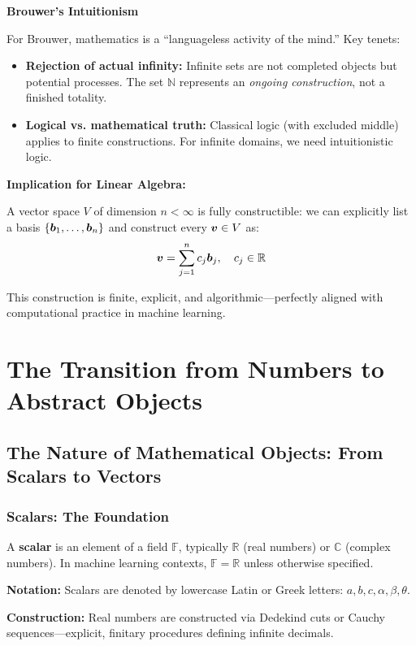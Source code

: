 \begin{intuitionbox}
    \textbf{Brouwer's Intuitionism}

    For Brouwer, mathematics is a ``languageless activity of the mind.'' Key
    tenets:
    
    \begin{itemize}
        \item \textbf{Rejection of actual infinity:} Infinite sets are not completed objects but potential processes. The set $\mathbb{N}$ represents an \textit{ongoing construction}, not a finished totality.

        \item \textbf{Logical vs. mathematical truth:} Classical logic (with excluded middle) applies to finite constructions. For infinite domains, we need intuitionistic logic.
    \end{itemize}

    \textbf{Implication for Linear Algebra:}

    A vector space $V$ of dimension $n < \infty$ is fully constructible: we can
    explicitly list a basis $\{\bm{b}_1, \ldots, \bm{b}_n\}$ and construct
    every $\bm{v} \in V$ as:
    \[
        \bm{v} = \sum_{j=1}^{n} c_j \bm{b}_j, \quad c_j \in \mathbb{R}
    \]

    This construction is finite, explicit, and algorithmic—perfectly aligned with
    computational practice in machine learning.
\end{intuitionbox}

\section{The Transition from Numbers to Abstract Objects}

\subsection{The Nature of Mathematical Objects: From Scalars to Vectors}

\subsubsection{Scalars: The Foundation}

\begin{definition}[Scalar]
    A \textbf{scalar} is an element of a field $\mathbb{F}$, typically $\mathbb{R}$ (real numbers) or $\mathbb{C}$ (complex numbers). In machine learning contexts, $\mathbb{F} = \mathbb{R}$ unless otherwise specified.

    \textbf{Notation:} Scalars are denoted by lowercase Latin or Greek letters: $a, b, c, \alpha, \beta, \theta$.

    \textbf{Construction:} Real numbers are constructed via Dedekind cuts or Cauchy sequences—explicit, finitary procedures defining infinite decimals.
\end{definition}

